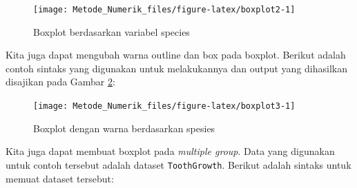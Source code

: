 \documentclass[]{book}
\newenvironment{Shaded}{\begin{snugshade}}{\end{snugshade}}
\newcommand{\CommentTok}[1]{\textcolor[rgb]{0.56,0.35,0.01}{\textit{#1}}}
\newcommand{\DataTypeTok}[1]{\textcolor[rgb]{0.13,0.29,0.53}{#1}}
\newcommand{\KeywordTok}[1]{\textcolor[rgb]{0.13,0.29,0.53}{\textbf{#1}}}
\newcommand{\NormalTok}[1]{#1}
\newcommand{\OperatorTok}[1]{\textcolor[rgb]{0.81,0.36,0.00}{\textbf{#1}}}
\newcommand{\StringTok}[1]{\textcolor[rgb]{0.31,0.60,0.02}{#1}}
\theoremstyle{definition}
\theoremstyle{definition}
\theoremstyle{definition}
\theoremstyle{remark}
\begin{document}
\begin{Shaded}
\end{Shaded}

\begin{figure}

{\centering \texttt{[image: Metode\_Numerik\_files/figure-latex/boxplot2-1]} 

}

\caption{Boxplot berdasarkan variabel species}\label{fig:boxplot2}
\end{figure}

Kita juga dapat mengubah warna outline dan box pada boxplot. Berikut adalah contoh sintaks yang digunakan untuk melakukannya dan output yang dihasilkan disajikan pada Gambar \ref{fig:boxplot3}:

\begin{Shaded}
\end{Shaded}

\begin{figure}

{\centering \texttt{[image: Metode\_Numerik\_files/figure-latex/boxplot3-1]} 

}

\caption{Boxplot dengan warna berdasarkan spesies}\label{fig:boxplot3}
\end{figure}

Kita juga dapat membuat boxplot pada \emph{multiple group}. Data yang digunakan untuk contoh tersebut adalah dataset \texttt{ToothGrowth}. Berikut adalah sintaks untuk memuat dataset tersebut:

\begin{Shaded}
\end{Shaded}
\end{document}

